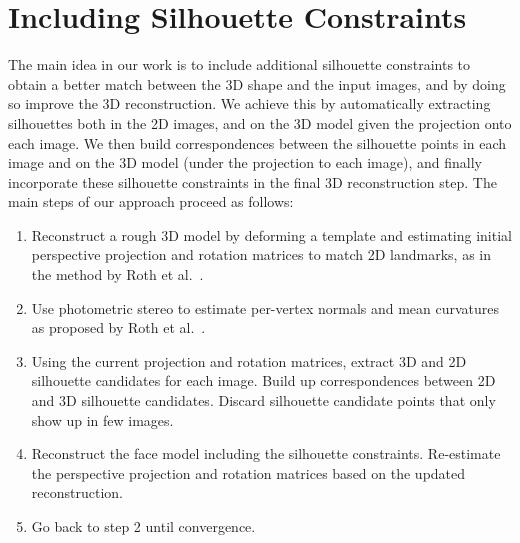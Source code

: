 \section{Including Silhouette Constraints}
\label{sec:silhouetteconstraints}

The main idea in our work is to include additional silhouette constraints to obtain a better match between the 3D shape and the input images, and by doing so improve the 3D reconstruction. We achieve this by automatically extracting silhouettes both in the 2D images, and on the 3D model given the projection onto each image. We then build correspondences between the silhouette points in each image and on the 3D model (under the projection to each image), and finally incorporate these silhouette constraints in the final 3D reconstruction step. 
%
%
The main steps of our approach proceed as follows:

\begin{enumerate}
\item Reconstruct a rough 3D model by deforming a template and estimating initial perspective projection and rotation matrices to match 2D landmarks, as in the method by Roth et al.~\cite{Roth:2015:UFR}. 

\item Use photometric stereo to estimate per-vertex normals and mean curvatures as proposed by Roth et al.~\cite{Roth:2015:UFR}.

\item Using the current projection and rotation matrices, extract 3D and 2D silhouette candidates for each image. Build up correspondences between 2D and 3D silhouette candidates. Discard silhouette candidate points that only show up in few images.

\item Reconstruct the face model including the silhouette constraints. Re-estimate the perspective projection and rotation matrices based on the updated reconstruction. 

\item Go back to step 2 until convergence. 
\end{enumerate}


